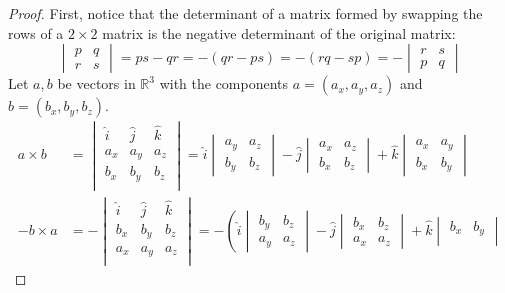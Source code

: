 \documentclass[preview, margin=0.6in]{standalone}
\begin{document}
\begin{proof}
	First, notice that the determinant of a matrix formed by swapping the rows of a $2\times 2$ matrix is the negative determinant of the original matrix:
	\begin{equation*}
		\begin{vmatrix}
			p & q \\
			r & s
		\end{vmatrix}
		=ps-qr
		=-(qr-ps)
		=-(rq-sp)
		=-\begin{vmatrix}
			r & s \\
			p & q
		\end{vmatrix}
	\end{equation*}
	Let $a,b$ be vectors in $\mathbb R^3$ with the components $a=(a_x,a_y,a_z)$ and $b=(b_x,b_y,b_z)$.
	\begin{align*}
	    a\times b
		&=\begin{vmatrix}
			\hat i & \hat j & \hat k \\
			a_x & a_y & a_z \\
			b_x & b_y & b_z \\
		\end{vmatrix}
		=
		\hat i \begin{vmatrix}
			a_y & a_z \\
			b_y & b_z
		\end{vmatrix}
		-\hat j \begin{vmatrix}
			a_x & a_z \\
			b_x & b_z
		\end{vmatrix}
		+\hat k \begin{vmatrix}
			a_x & a_y \\
			b_x & b_y
		\end{vmatrix} \\
	    -b\times a
		&=-\begin{vmatrix}
			\hat i & \hat j & \hat k \\
			b_x & b_y & b_z \\
			a_x & a_y & a_z \\
		\end{vmatrix}
		=-\left(
		\hat i \begin{vmatrix}
			b_y & b_z \\
			a_y & a_z
		\end{vmatrix}
		-\hat j \begin{vmatrix}
			b_x & b_z \\
			a_x & a_z
		\end{vmatrix}
		+\hat k \begin{vmatrix}
			b_x & b_y \\

\end{vmatrix}
\end{align*}
\end{proof}
\end{document}

